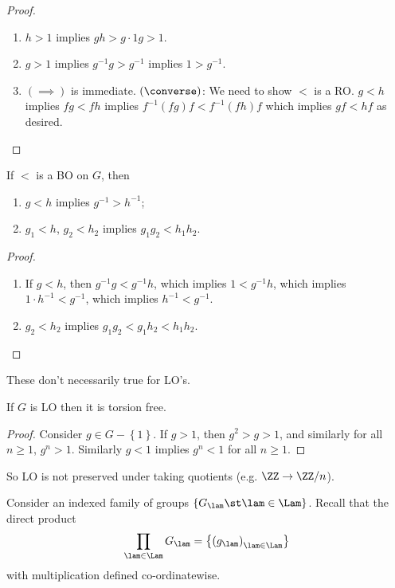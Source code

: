 \begin{proof}
\begin{enumerate}
\item $h > 1$ implies $gh > g\cdot 1 g > 1$.
\item $g > 1$ implies $g^{-1} g > g^{-1}$ implies $1 > g^{-1}$.
\item $\left(\implies\right)$ is immediate. $\left(\converse\right)$: We need to show $<$
is a RO. $g < h$ implies $fg < fh$ implies $f^{-1} \left(fg\right)f <
f^{-1}\left(fh\right)f$ which implies $gf < hf$ as desired.
\end{enumerate}
\end{proof}

\begin{lem}
If $<$ is a BO on $G$, then
\begin{enumerate}
\item $g < h$ implies $g^{-1} > h^{-1}$;
\item $g_1 < h$, $g_2 < h_2$ implies $g_1 g_2 < h_1 h_2$.
\end{enumerate}
\label{lem:1.2}
\end{lem}

\begin{proof}
\begin{enumerate}
\item If $g < h$, then $g^{-1} g < g^{-1} h$, which implies $1 < g^{-1} h$, which implies
$1\cdot h^{-1} < g^{-1}$, which implies $h^{-1} < g^{-1}$.
\item $g_2 < h_2$ implies $g_1 g_2 < g_1 h_2 < h_1 h_2$.
\end{enumerate}
\end{proof}

\begin{wrn}
These don't necessarily true for LO's.
\end{wrn}

\begin{lem}
If $G$ is LO then it is torsion free.
\label{lem:1.3}
\end{lem}

\begin{proof}
Consider $g\in G\minus \left\{1\right\}$. If $g > 1$, then $g^2 > g > 1$, and similarly
for all $n\geq 1$, $g^n > 1$.
Similarly $g < 1$ implies $g^n < 1$ for all $n\geq 1$.
\end{proof}

So LO is not preserved under taking quotients (e.g. $\ZZ \to \ZZ / n$).

Consider an indexed family of groups $\left\{G_\lam \st \lam \in \Lam\right\}$.
Recall that the direct product
\begin{equation}
\prod_{\lam \in \Lam} G_\lam = \left\{
\left(g_\lam\right)_{\lam \in \Lam}
\right\}
\end{equation}
with multiplication defined co-ordinatewise.

